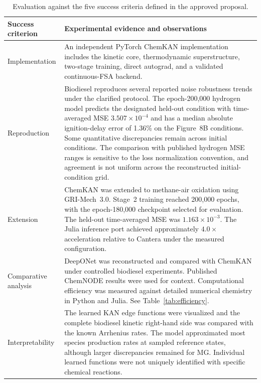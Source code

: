 \documentclass[11pt,a4paper]{article}
\begin{document}
\begin{table}[H]
\centering
\small
\caption{Evaluation against the five success
criteria defined in the approved proposal.}
\label{tab:success_criteria}
\begin{tabularx}{\textwidth}{@{}p{}X@{}}
\toprule
\textbf{Success criterion} &
\textbf{Experimental evidence and observations} \\
\midrule

Implementation &
An independent PyTorch ChemKAN implementation
includes the kinetic core, thermodynamic
superstructure, two-stage training, direct
autograd, and a validated continuous-FSA backend. \\

Reproduction &
Biodiesel reproduces several reported noise
robustness trends under the clarified protocol.
The epoch-200,000 hydrogen model predicts the designated
held-out condition with time-averaged MSE
$3.507\times10^{-4}$ and has a median absolute
ignition-delay error of 1.36\% on the Figure~8B
conditions. Some quantitative discrepancies
remain across initial conditions.
The comparison with published hydrogen
MSE ranges is sensitive to the loss
normalization convention, and agreement
is not uniform across the reconstructed
initial-condition grid.\\

Extension &
ChemKAN was extended to methane-air oxidation
using GRI-Mech~3.0. Stage~2 training reached
200,000 epochs, with the epoch-180,000 checkpoint selected
for evaluation. The held-out time-averaged MSE
was $1.163\times10^{-3}$.
The Julia inference port achieved approximately
$4.0\times$ acceleration relative to Cantera
under the measured configuration. \\

Comparative analysis &
DeepONet was reconstructed and compared with
ChemKAN under controlled biodiesel experiments.
Published ChemNODE results were used for
context. Computational efficiency was measured
against detailed numerical chemistry in Python
and Julia. See Table~\ref{tab:efficiency}. \\

Interpretability &

The learned KAN edge functions were visualized
and the complete biodiesel kinetic right-hand
side was compared with the known Arrhenius rates.
The model approximated most species production
rates at sampled reference states, although
larger discrepancies remained for MG.
Individual learned functions were not uniquely
identified with specific chemical reactions.\\

\bottomrule
\end{tabularx}
\end{table}
\end{document}
